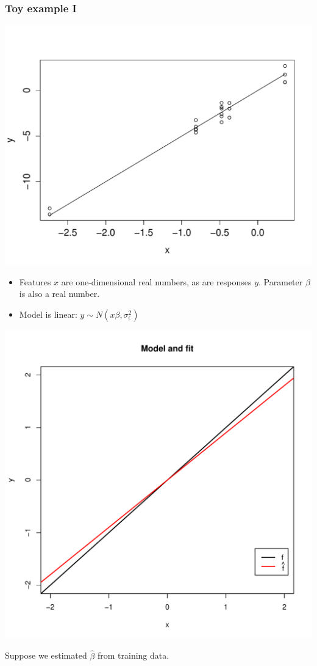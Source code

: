 \documentclass{beamer}
\begin{document}
\begin{frame}
\frametitle{Toy example I}
\begin{center}
\includegraphics[scale = 0.3]{1d_0.pdf}
\end{center}
\begin{itemize}
\item Features $x$ are one-dimensional real numbers, as are responses
  $y$.  Parameter $\beta$ is also a real number.
\item Model is linear: $y \sim N(x\beta, \sigma^2_\epsilon)$
\end{itemize}
\end{frame}

\begin{frame}
\begin{center}
\includegraphics[scale = 0.4]{ti1.pdf}
\end{center}
Suppose we estimated $\hat{\beta}$ from training data.
\end{frame}
\end{document}
